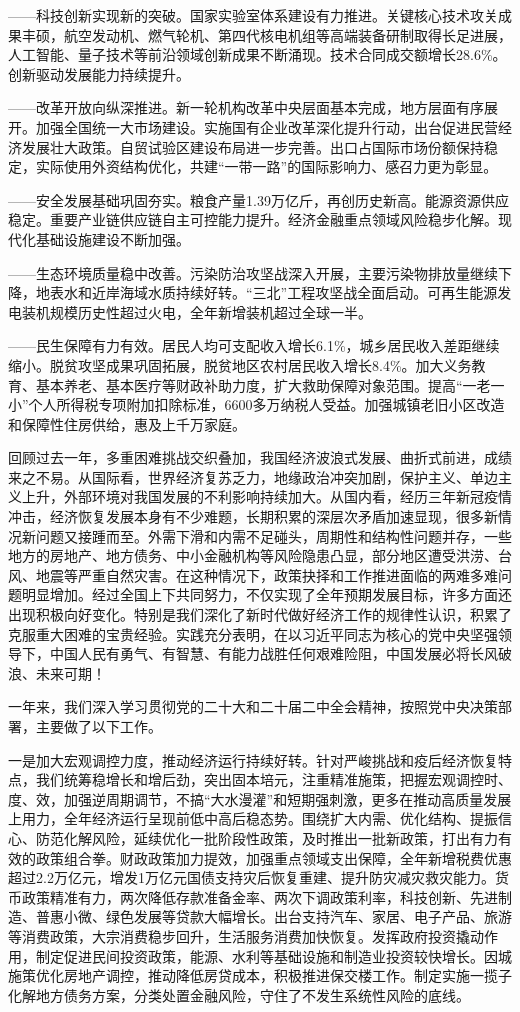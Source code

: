 \documentclass[10pt, UTF8]{ctexbook} %
\begin{document}
——科技创新实现新的突破。国家实验室体系建设有力推进。关键核心技术攻关成果丰硕，航空发动机、燃气轮机、第四代核电机组等高端装备研制取得长足进展，人工智能、量子技术等前沿领域创新成果不断涌现。技术合同成交额增长28.6\%。创新驱动发展能力持续提升。

——改革开放向纵深推进。新一轮机构改革中央层面基本完成，地方层面有序展开。加强全国统一大市场建设。实施国有企业改革深化提升行动，出台促进民营经济发展壮大政策。自贸试验区建设布局进一步完善。出口占国际市场份额保持稳定，实际使用外资结构优化，共建“一带一路”的国际影响力、感召力更为彰显。

——安全发展基础巩固夯实。粮食产量1.39万亿斤，再创历史新高。能源资源供应稳定。重要产业链供应链自主可控能力提升。经济金融重点领域风险稳步化解。现代化基础设施建设不断加强。

——生态环境质量稳中改善。污染防治攻坚战深入开展，主要污染物排放量继续下降，地表水和近岸海域水质持续好转。“三北”工程攻坚战全面启动。可再生能源发电装机规模历史性超过火电，全年新增装机超过全球一半。

——民生保障有力有效。居民人均可支配收入增长6.1\%，城乡居民收入差距继续缩小。脱贫攻坚成果巩固拓展，脱贫地区农村居民收入增长8.4\%。加大义务教育、基本养老、基本医疗等财政补助力度，扩大救助保障对象范围。提高“一老一小”个人所得税专项附加扣除标准，6600多万纳税人受益。加强城镇老旧小区改造和保障性住房供给，惠及上千万家庭。

回顾过去一年，多重困难挑战交织叠加，我国经济波浪式发展、曲折式前进，成绩来之不易。从国际看，世界经济复苏乏力，地缘政治冲突加剧，保护主义、单边主义上升，外部环境对我国发展的不利影响持续加大。从国内看，经历三年新冠疫情冲击，经济恢复发展本身有不少难题，长期积累的深层次矛盾加速显现，很多新情况新问题又接踵而至。外需下滑和内需不足碰头，周期性和结构性问题并存，一些地方的房地产、地方债务、中小金融机构等风险隐患凸显，部分地区遭受洪涝、台风、地震等严重自然灾害。在这种情况下，政策抉择和工作推进面临的两难多难问题明显增加。经过全国上下共同努力，不仅实现了全年预期发展目标，许多方面还出现积极向好变化。特别是我们深化了新时代做好经济工作的规律性认识，积累了克服重大困难的宝贵经验。实践充分表明，在以习近平同志为核心的党中央坚强领导下，中国人民有勇气、有智慧、有能力战胜任何艰难险阻，中国发展必将长风破浪、未来可期！

一年来，我们深入学习贯彻党的二十大和二十届二中全会精神，按照党中央决策部署，主要做了以下工作。

一是加大宏观调控力度，推动经济运行持续好转。针对严峻挑战和疫后经济恢复特点，我们统筹稳增长和增后劲，突出固本培元，注重精准施策，把握宏观调控时、度、效，加强逆周期调节，不搞“大水漫灌”和短期强刺激，更多在推动高质量发展上用力，全年经济运行呈现前低中高后稳态势。围绕扩大内需、优化结构、提振信心、防范化解风险，延续优化一批阶段性政策，及时推出一批新政策，打出有力有效的政策组合拳。财政政策加力提效，加强重点领域支出保障，全年新增税费优惠超过2.2万亿元，增发1万亿元国债支持灾后恢复重建、提升防灾减灾救灾能力。货币政策精准有力，两次降低存款准备金率、两次下调政策利率，科技创新、先进制造、普惠小微、绿色发展等贷款大幅增长。出台支持汽车、家居、电子产品、旅游等消费政策，大宗消费稳步回升，生活服务消费加快恢复。发挥政府投资撬动作用，制定促进民间投资政策，能源、水利等基础设施和制造业投资较快增长。因城施策优化房地产调控，推动降低房贷成本，积极推进保交楼工作。制定实施一揽子化解地方债务方案，分类处置金融风险，守住了不发生系统性风险的底线。
\end{document}
